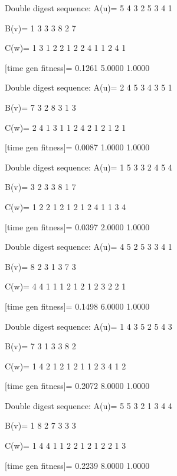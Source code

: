 Double digest sequence:
A(u)=
     5     4     3     2     5     3     4     1

B(v)=
     1     3     3     3     8     2     7

C(w)=
     1     3     1     2     2     1     2     2     4     1     1     2     4     1

[time gen fitness]=
    0.1261    5.0000    1.0000

Double digest sequence:
A(u)=
     2     4     5     3     4     3     5     1

B(v)=
     7     3     2     8     3     1     3

C(w)=
     2     4     1     3     1     1     2     4     2     1     2     1     2     1

[time gen fitness]=
    0.0087    1.0000    1.0000

Double digest sequence:
A(u)=
     1     5     3     3     2     4     5     4

B(v)=
     3     2     3     3     8     1     7

C(w)=
     1     2     2     1     2     1     2     1     2     4     1     1     3     4

[time gen fitness]=
    0.0397    2.0000    1.0000

Double digest sequence:
A(u)=
     4     5     2     5     3     3     4     1

B(v)=
     8     2     3     1     3     7     3

C(w)=
     4     4     1     1     1     2     1     2     1     2     3     2     2     1

[time gen fitness]=
    0.1498    6.0000    1.0000

Double digest sequence:
A(u)=
     1     4     3     5     2     5     4     3

B(v)=
     7     3     1     3     3     8     2

C(w)=
     1     4     2     1     2     1     2     1     1     2     3     4     1     2

[time gen fitness]=
    0.2072    8.0000    1.0000

Double digest sequence:
A(u)=
     5     5     3     2     1     3     4     4

B(v)=
     1     8     2     7     3     3     3

C(w)=
     1     4     4     1     1     2     2     1     2     1     2     2     1     3

[time gen fitness]=
    0.2239    8.0000    1.0000

